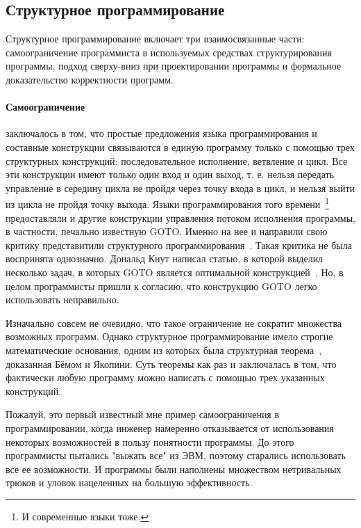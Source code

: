 \subsection{Структурное программирование}

Структурное программирование включает три взаимосвязанные части: самоограничение программиста в используемых средствах структурирования программы, подход сверху-вниз при проектировании программы и формальное доказательство корректности программ.

\paragraph{Самоограничение} заключалось в том, что простые предложения языка программирования и составные конструкции связываются в единую программу только с помощью трех структурных конструкций: последовательное исполнение, ветвление и цикл. Все эти конструкции имеют только один вход и один выход, т. е. нельзя передать управление в середину цикла не пройдя через точку входа в цикл, и нельзя выйти из цикла не пройдя точку выхода. Языки программирования того времени~\footnote{И современные языки тоже.} предоставляли и другие конструкции управления потоком исполнения программы, в частности, печально известную GOTO. Именно на нее и направили свою критику представитили структурного программирования~\cite{Dijkstra:1968:LEG}. Такая критика не была воспринята однозначно. Дональд Кнут написал статью, в которой выделил несколько задач, в которых GOTO является оптимальной конструкцией~\cite{Knuth:1974:SPG}. Но, в целом программисты пришли к согласию, что конструкцию GOTO легко использовать неправильно.

Изначально совсем не очевидно, что такое ограничение не сократит множества возможных программ. Однако структурное программирование имело строгие математические основания, одним из которых была структурная теорема~\cite{SPT}, доказанная Бёмом и Якопини. Суть теоремы как раз и заключалась в том, что фактически любую программу можно написать с помощью трех указанных конструкций.

Пожалуй, это первый известный мне пример самоограничения в программировании, когда инженер намеренно отказывается от использования некоторых возможностей в пользу понятности программы. До этого программисты пытались "выжать все" из ЭВМ, поэтому старались использовать все ее возможности. И программы были наполнены множеством нетривальных трюков и уловок нацеленных на большую эффективность.

